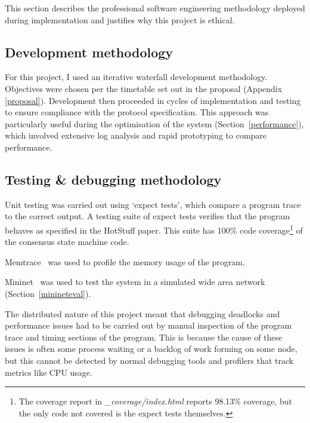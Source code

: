 This section describes the professional software engineering methodology deployed during implementation and justifies why this project is ethical.

\subsection{Development methodology} \label{devmethods}

For this project, I used an iterative waterfall development methodology. Objectives were chosen per the timetable set out in the proposal (Appendix \ref{proposal}). Development then proceeded in cycles of implementation and testing to ensure compliance with the protocol specification. This approach was particularly useful during the optimisation of the system (Section~\ref{performance}), which involved extensive log analysis and rapid prototyping to compare performance.

\subsection{Testing \& debugging methodology} \label{testing}

Unit testing was carried out using `expect tests', which compare a program trace to the correct output. A testing suite of expect tests verifies that the program behaves as specified in the HotStuff paper. This suite has 100\% code coverage\footnote{The coverage report in \textit{\_coverage/index.html} reports 98.13\% coverage, but the only code not covered is the expect tests themselves.} of the consensus state machine code.%

Memtrace~\cite{memtrace} was used to profile the memory usage of the program. %

Mininet~\cite{mininet,lantzNetworkLaptopRapid2010} was used to test the system in a simulated wide area network (Section~\ref{minineteval}).

The distributed nature of this project meant that debugging deadlocks and performance issues had to be carried out by manual inspection of the program trace and timing sections of the program. This is because the cause of these issues is often some process waiting or a backlog of work forming on some node, but this cannot be detected by normal debugging tools and profilers that track metrics like CPU usage.

